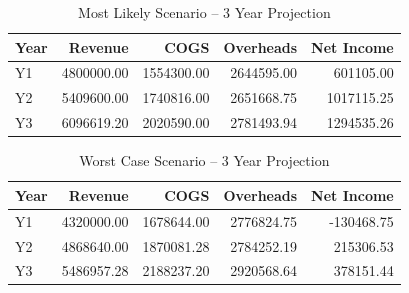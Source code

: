 \begin{table}[H]
\centering
\caption{Most Likely Scenario – 3 Year Projection}
\begin{tabular}{|l|r|r|r|r|}
\hline
\textbf{Year} & \textbf{Revenue} & \textbf{COGS} & \textbf{Overheads} & \textbf{Net Income} \\
\hline
Y1 & 4800000.00 & 1554300.00 & 2644595.00 & 601105.00 \\
\hline
Y2 & 5409600.00 & 1740816.00 & 2651668.75 & 1017115.25 \\
\hline
Y3 & 6096619.20 & 2020590.00 & 2781493.94 & 1294535.26 \\
\hline
\end{tabular}
\end{table}

\begin{table}[H]
\centering
\caption{Worst Case Scenario – 3 Year Projection}
\begin{tabular}{|l|r|r|r|r|}
\hline
\textbf{Year} & \textbf{Revenue} & \textbf{COGS} & \textbf{Overheads} & \textbf{Net Income} \\
\hline
Y1 & 4320000.00 & 1678644.00 & 2776824.75 & -130468.75 \\
\hline
Y2 & 4868640.00 & 1870081.28 & 2784252.19 & 215306.53 \\
\hline
Y3 & 5486957.28 & 2188237.20 & 2920568.64 & 378151.44 \\
\hline
\end{tabular}
\end{table}

